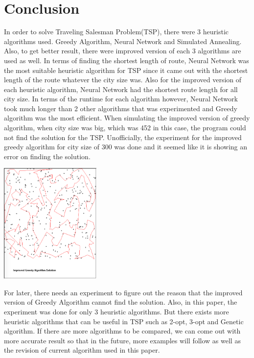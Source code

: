 \documentclass[12pt]{article}
\begin{document}
\section{Conclusion}
In order to solve Traveling Salesman Problem(TSP), there were 3 heuristic algorithms used. Greedy Algorithm, Neural Network and Simulated Annealing. Also, to get better result, there were improved version of each 3 algorithms are used as well. In terms of finding the shortest length of route, Neural Network was the most suitable heuristic algorithm for TSP since it came out with the shortest length of the route whatever the city size was. Also for the improved version of each heuristic algorithm, Neural Network had the shortest route length for all city size. In terms of the runtime for each algorithm however, Neural Network took much longer than 2 other algorithms that was experimented and Greedy algorithm was the most efficient. \newline
When simulating the improved version of greedy algorithm, when city size was big, which was 452 in this case, the program could not find the solution for the TSP. Unofficially, the experiment for the improved greedy algorithm for city size of 300 was done and it seemed like it is showing an error on finding the solution.
\begin{center}
            \includegraphics[width=5cm]{ImprovedGreedy300.png}
		\end{center}  
For later, there needs an experiment to figure out the reason that the improved version of Greedy Algorithm cannot find the solution. Also, in this paper, the experiment was done for only 3 heuristic algorithms. But there exists more heuristic algorithms that can be useful in TSP such as 2-opt, 3-opt and Genetic algorithm.\cite{Genetic} If there are more algorithms to be compared, we can come out with more accurate result so that in the future, more examples will follow as well as the revision of current algorithm used in this paper. 
\newpage


\end{document}
